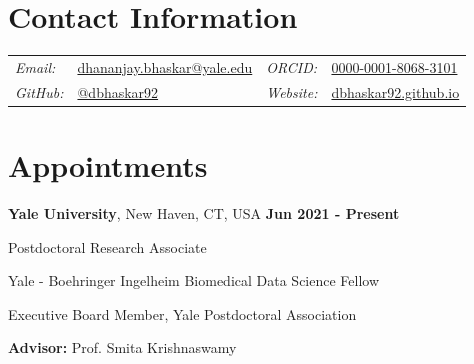 \documentclass[margin,line]{res}
\newenvironment{list1}{
  \begin{list}{\ding{113}}{
      \setlength{\itemsep}{0in}
      \setlength{\parsep}{0in} \setlength{\parskip}{0in}
      \setlength{\topsep}{0in} \setlength{\partopsep}{0in}
      \setlength{\leftmargin}{0.17in}}}{\end{list}}
\begin{document}
\pagestyle{plain}


\begin{resume}

\vspace*{.2cm}

\section{\sc Contact Information}

\renewcommand{\arraystretch}{1.1}
\begin{tabular}{@{}p{1.8cm}p{6.3cm}p{2.1cm}p{4cm}}
{\it Email:} & \href{mailto:dhananjay.bhaskar@yale.edu}{dhananjay.bhaskar@yale.edu} & {\it ORCID:} & \href{https://orcid.org/0000-0001-8068-3101}{0000-0001-8068-3101} \\
{\it GitHub:} & \href{https://github.com/dbhaskar92}{@dbhaskar92} & {\it Website:} & \href{https://dbhaskar92.github.io/}{dbhaskar92.github.io}
\end{tabular}

\vspace*{.05cm}


\section{\sc Appointments}

{\bf Yale University}, New Haven, CT, USA  \hfill {\bf Jun 2021 - Present}\\
\vspace*{-.2cm}
\begin{list1}
\setlength\itemsep{0.22em}
\item[] Postdoctoral Research Associate
\item[] Yale - Boehringer Ingelheim Biomedical Data Science Fellow
\item[] Executive Board Member, Yale Postdoctoral Association
\vspace*{.1cm}
\item[] {\bf Advisor:} Prof. Smita Krishnaswamy
\end{list1}


\end{resume}
\end{document}
